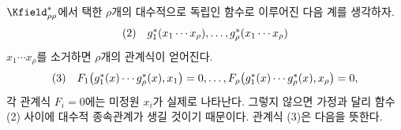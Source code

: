 
$\Kfield^*_{\rho\rho}$에서 택한 $\rho$개의 대수적으로 독립인 함수로 이루어진 다음 계를 생각하자.
\[
\begin{array}{@{}l@{\quad}c@{}}
(2)& g_1^*(x_1\cdots x_\rho),\ldots,g_\rho^*(x_1\cdots x_\rho)
\end{array}
\]
$x_1\cdots x_\rho$를 소거하면 $\rho$개의 관계식이 얻어진다.
\[
\begin{array}{@{}l@{\quad}c@{}}
(3)& F_1\bigl(g_1^*(x)\cdots g_\rho^*(x),x_1\bigr)=0,\ldots,
F_\rho\bigl(g_1^*(x)\cdots g_\rho^*(x),x_\rho\bigr)=0,
\end{array}
\]
각 관계식 $F_i=0$에는 미정원 $x_i$가 실제로 나타난다. 그렇지 않으면 가정과 달리 함수 (2) 사이에 대수적 종속관계가 생길 것이기 때문이다. 관계식 (3)은 다음을 뜻한다.
